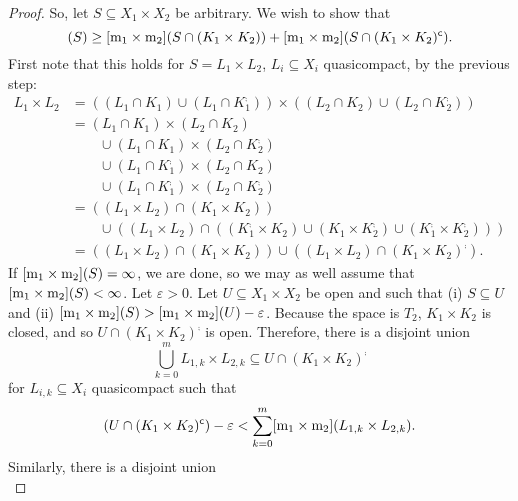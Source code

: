 \begin{thm}
\begin{proof}
So, let $S\subseteq X_1\times X_2$ be arbitrary.  We wish to show that
\begin{equation}
[\meas _1\times \meas _2](S)\geq [\meas _1\times \meas _2](S\cap (K_1\times K_2))+[\meas _1\times \meas _2](S\cap (K_1\times K_2)^{\comp}).
\end{equation}
First note that this holds for $S=L_1\times L_2$, $L_i\subseteq X_i$ quasicompact, by the previous step:
\begin{equation}
\begin{split}
L_1\times L_2 & =\left( (L_1\cap K_1)\cup (L_1\cap K_1^{\comp})\right) \times \left( (L_2\cap K_2)\cup ( L_2\cap K_2^{\comp})\right) \\
& =(L_1\cap K_1)\times (L_2\cap K_2) \\
& \qquad \cup (L_1\cap K_1)\times (L_2\cap K_2^{\comp}) \\
& \qquad \cup (L_1\cap K_1^{\comp})\times (L_2\cap K_2) \\
& \qquad \cup (L_1\cap K_1^{\comp})\times (L_2\cap K_2^{\comp}) \\
& =\left( (L_1\times L_2)\cap (K_1\times K_2)\right) \\
& \qquad \cup \left( (L_1\times L_2)\cap \left( (K_1^{\comp}\times K_2)\cup (K_1\times K_2^{\comp})\cup (K_1^{\comp}\times K_2^{\comp})\right) \right) \\
& =\left( (L_1\times L_2)\cap (K_1\times K_2)\right) \cup \left( (L_1\times L_2)\cap (K_1\times K_2)^{\comp}\right) .
\end{split}
\end{equation}
If $[\mathrm{m} _1\times \mathrm{m} _2](S)=\infty$, we are done, so we may as well assume that $[\mathrm{m} _1\times \mathrm{m} _2](S)<\infty$.  Let $\varepsilon >0$.  Let $U\subseteq X_1\times X_2$ be open and such that (i) $S\subseteq U$ and (ii) $[\mathrm{m} _1\times \mathrm{m} _2](S)>[\mathrm{m} _1\times \mathrm{m} _2](U)-\varepsilon$.  Because the space is $T_2$, $K_1\times K_2$ is closed, and so $U\cap (K_1\times K_2)^{\comp}$ is open.  Therefore, there is a disjoint union
\begin{equation}
\bigcup _{k=0}^mL_{1,k}\times L_{2,k}\subseteq U\cap (K_1\times K_2)^{\comp}
\end{equation}
for $L_{i,k}\subseteq X_i$ quasicompact such that
\begin{equation}
[\meas _1\times \meas _2](U\cap (K_1\times K_2)^{\comp})-\varepsilon <\sum _{k=0}^m[\meas _1\times \meas _2](L_{1,k}\times L_{2,k}).
\end{equation}
Similarly, there is a disjoint union
\begin{equation}

\end{equation}
\end{proof}
\end{thm}
